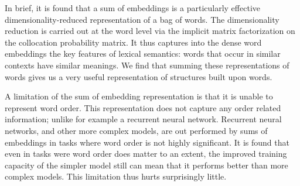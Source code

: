 \documentclass{book}
\begin{document}
In brief, it is found that a sum of embeddings is a particularly effective dimensionality-reduced representation of a bag of words.
The dimensionality reduction is carried out at the word level via the implicit matrix factorization 
on the collocation probability matrix.
It thus captures into the dense word embeddings the key features of lexical semantics:
words that occur in similar contexts have similar meanings.
We find that summing these representations of words gives us a very useful representation of structures built upon words.

A limitation of the sum of embedding representation is that it is unable to represent word order.
This representation does not capture any order related information; unlike for example a recurrent neural network.
Recurrent neural networks, and other more complex models, are out performed by sums of embeddings in tasks where word order is not highly significant.
It is found that even in tasks were word order does matter to an extent, the improved training capacity of the simpler model still can mean that it performs better than more complex models.
This limitation thus hurts surprisingly little.
\end{document}
